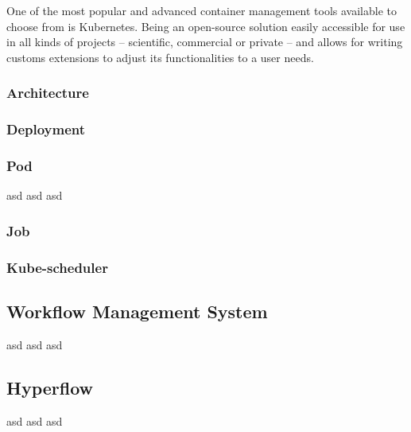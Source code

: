 One of the most popular and advanced container management tools available to choose from is Kubernetes.
Being an open-source solution easily accessible for use in all kinds of projects -- scientific, commercial or private -- and allows for writing customs extensions to adjust its functionalities to a user needs.

\subsubsection{Architecture}


\subsubsection{Deployment}


\subsubsection{Pod}
asd asd asd


\subsubsection{Job}


\subsubsection{Kube-scheduler}


\subsection{Workflow Management System}

asd asd asd

\subsection{Hyperflow}


asd asd asd



